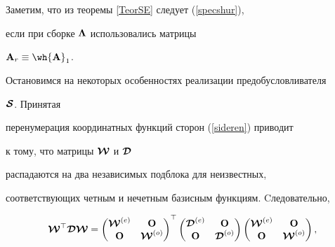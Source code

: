 







Заметим, что из теоремы \ref{TeorSE} следует (\ref{specshur}),


если при сборке $\boldsymbol {\Lambda}$ использовались матрицы \linebreak


${\bold A}_r\equiv \wh{{\bold A}}_1$.





Остановимся на некоторых особенностях реализации предобусловливателя 


$\boldsymbol {\cal S}$. Принятая


перенумерация координатных функций сторон (\ref{sideren}) приводит


к тому, что матрицы $\boldsymbol {\cal W}$ и $\boldsymbol {\cal D}$


распадаются на два независимых подблока для неизвестных,


соответствующих четным и нечетным базисным функциям. Cледовательно,


\begin{equation*}




\bi{\cal W}^\top \bi{\cal D} \bi{\cal W}=


\begin{pmatrix}


\bi{\cal W}^{(e)} & \bold O \\


\bold O & \bi{\cal W}^{(o)}


\end{pmatrix}


^\top


\begin{pmatrix}


\bi{\cal D}^{(e)} & \bold O \\


\bold O & \bi {\cal D}^{(o)}


\end{pmatrix}


\begin{pmatrix}


\bi{\cal W}^{(e)} & \bold O \\


\bold O & \bi{\cal W}^{(o)}


\end{pmatrix}


,


\end{equation*}


